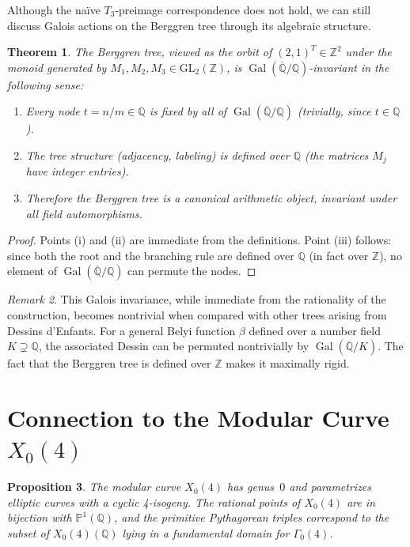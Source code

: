 \documentclass[12pt]{amsart}
\newtheorem{theorem}{Theorem}[section]
\newtheorem{proposition}[theorem]{Proposition}
\theoremstyle{definition}
\theoremstyle{remark}
\newtheorem{remark}[theorem]{Remark}
\newcommand{\ZZ}{\mathbb{Z}}
\newcommand{\QQ}{\mathbb{Q}}
\newcommand{\PP}{\mathbb{P}}
\newcommand{\Gal}{\operatorname{Gal}}
\begin{document}
Although the na\"ive $T_3$-preimage correspondence does not hold, we
can still discuss Galois actions on the Berggren tree through its
algebraic structure.

\begin{theorem}\label{thm:galois-invariant}
The Berggren tree, viewed as the orbit of $(2,1)^T\in\ZZ^2$ under
the monoid generated by $M_1, M_2, M_3\in\mathrm{GL}_2(\ZZ)$, is
$\Gal(\overline{\QQ}/\QQ)$-invariant in the following sense:
\begin{enumerate}[label=(\roman*)]
  \item Every node $t = n/m \in \QQ$ is fixed by all of
        $\Gal(\overline{\QQ}/\QQ)$ (trivially, since $t\in\QQ$).
  \item The tree structure (adjacency, labeling) is defined over $\QQ$
        (the matrices $M_j$ have integer entries).
  \item Therefore the Berggren tree is a \emph{canonical} arithmetic
        object, invariant under all field automorphisms.
\end{enumerate}
\end{theorem}

\begin{proof}
Points (i) and (ii) are immediate from the definitions.  Point (iii)
follows: since both the root and the branching rule are defined over
$\QQ$ (in fact over $\ZZ$), no element of $\Gal(\overline{\QQ}/\QQ)$
can permute the nodes.
\end{proof}

\begin{remark}
This Galois invariance, while immediate from the rationality of the
construction, becomes nontrivial when compared with other trees arising
from Dessins d'Enfants.  For a general Belyi function $\beta$ defined
over a number field $K\supsetneq\QQ$, the associated Dessin can be
permuted nontrivially by $\Gal(\overline{\QQ}/K)$.  The fact that the
Berggren tree is defined over $\ZZ$ makes it maximally rigid.
\end{remark}


\section{Connection to the Modular Curve $X_0(4)$}\label{sec:modular}

\begin{proposition}\label{prop:X04}
The modular curve $X_0(4)$ has genus~$0$ and parametrizes elliptic
curves with a cyclic 4-isogeny.  The rational points of $X_0(4)$
are in bijection with $\PP^1(\QQ)$, and the primitive Pythagorean
triples correspond to the subset of $X_0(4)(\QQ)$ lying in a
fundamental domain for $\Gamma_0(4)$.
\end{proposition}
\end{document}
